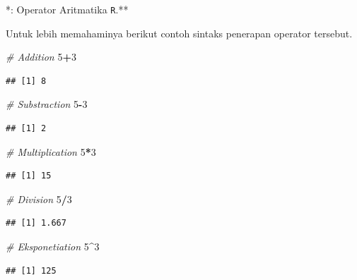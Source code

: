 \documentclass[]{book}
\newenvironment{Shaded}{\begin{snugshade}}{\end{snugshade}}
\newcommand{\DecValTok}[1]{\textcolor[rgb]{0.00,0.00,0.81}{#1}}
\newcommand{\CommentTok}[1]{\textcolor[rgb]{0.56,0.35,0.01}{\textit{#1}}}
\newcommand{\OperatorTok}[1]{\textcolor[rgb]{0.81,0.36,0.00}{\textbf{#1}}}
\begin{document}
*: \label{tab:oparitmatika} Operator Aritmatika \texttt{R}.**

Untuk lebih memahaminya berikut contoh sintaks penerapan operator
tersebut.

\begin{Shaded}
\begin{Highlighting}[]
\CommentTok{# Addition}
\DecValTok{5}\OperatorTok{+}\DecValTok{3}
\end{Highlighting}
\end{Shaded}

\begin{verbatim}
## [1] 8
\end{verbatim}

\begin{Shaded}
\begin{Highlighting}[]
\CommentTok{# Substraction}
\DecValTok{5}\OperatorTok{-}\DecValTok{3}
\end{Highlighting}
\end{Shaded}

\begin{verbatim}
## [1] 2
\end{verbatim}

\begin{Shaded}
\begin{Highlighting}[]
\CommentTok{# Multiplication}
\DecValTok{5}\OperatorTok{*}\DecValTok{3}
\end{Highlighting}
\end{Shaded}

\begin{verbatim}
## [1] 15
\end{verbatim}

\begin{Shaded}
\begin{Highlighting}[]
\CommentTok{# Division}
\DecValTok{5}\OperatorTok{/}\DecValTok{3}
\end{Highlighting}
\end{Shaded}

\begin{verbatim}
## [1] 1.667
\end{verbatim}

\begin{Shaded}
\begin{Highlighting}[]
\CommentTok{# Eksponetiation}
\DecValTok{5}\OperatorTok{^}\DecValTok{3}
\end{Highlighting}
\end{Shaded}

\begin{verbatim}
## [1] 125
\end{verbatim}
\end{document}

